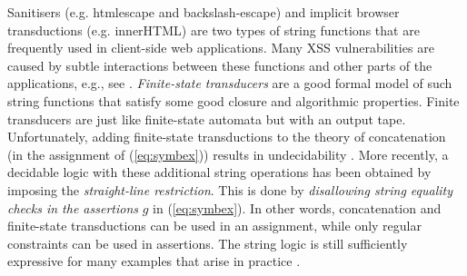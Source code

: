 Sanitisers (e.g. htmlescape and backslash-escape)
and implicit browser transductions (e.g. innerHTML)
are two types of string functions that are frequently used in client-side
web applications. Many XSS vulnerabilities are caused by
subtle interactions between these functions and other parts of the
applications, e.g., see \cite{web-model,Kern14,DV13,LB16,mXSS}. 
\emph{Finite-state transducers} 
\cite{BEK,web-model,DV13,symbolic-transducer,LB16}
are a good formal model of such string functions that satisfy some
good closure and algorithmic properties. 
Finite transducers are just like
finite-state automata but with an output tape.
Unfortunately, adding finite-state transductions to
the theory of concatenation (in the assignment of (\ref{eq:symbex})) results in 
undecidability \cite{LB16}.
More recently, a decidable logic with these additional string 
operations \cite{LB16} has been obtained by imposing 
the \emph{straight-line restriction}. %
This is done 
by \emph{disallowing string equality checks in the assertions} $g$ in 
(\ref{eq:symbex}). In other words, concatenation and finite-state transductions
can be used in an assignment, while only regular constraints can be used in
assertions. The string logic is still 
sufficiently expressive
for many examples that arise in practice \cite{LB16,HJLRV18}.





